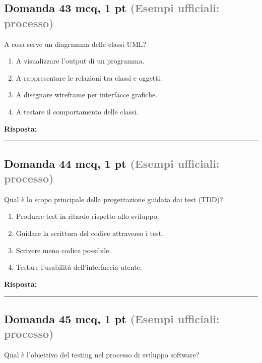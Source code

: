 \documentclass[a4paper,11pt]{article}
\begin{document}
\subsection*{Domanda 43 \hfill {\small mcq, 1 pt \textcolor{gray}{(Esempi ufficiali: processo)}}}
A cosa serve un diagramma delle classi UML?

\begin{enumerate}[label=\alph*)]
\item A visualizzare l'output di un programma.
\item A rappresentare le relazioni tra classi e oggetti.
\item A disegnare wireframe per interfacce grafiche.
\item A testare il comportamento delle classi.
\end{enumerate}
\vspace{0.2cm}
\noindent\textbf{Risposta:}\par
\vspace{1.5cm}\hrule


\subsection*{Domanda 44 \hfill {\small mcq, 1 pt \textcolor{gray}{(Esempi ufficiali: processo)}}}
Qual è lo scopo principale della progettazione guidata dai test (TDD)?

\begin{enumerate}[label=\alph*)]
\item Produrre test in ritardo rispetto allo sviluppo.
\item Guidare la scrittura del codice attraverso i test.
\item Scrivere meno codice possibile.
\item Testare l'usabilità dell'interfaccia utente.
\end{enumerate}
\vspace{0.2cm}
\noindent\textbf{Risposta:}\par
\vspace{1.5cm}\hrule


\subsection*{Domanda 45 \hfill {\small mcq, 1 pt \textcolor{gray}{(Esempi ufficiali: processo)}}}
Qual è l'obiettivo del testing nel processo di sviluppo software?
\end{document}
